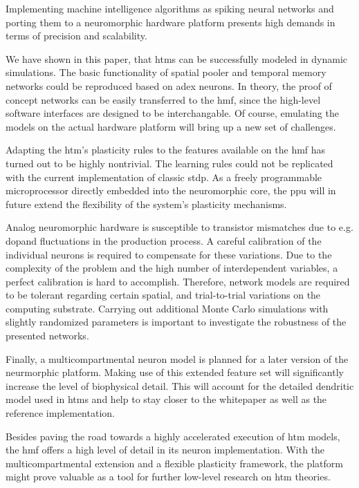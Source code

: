 Implementing machine intelligence algorithms as spiking neural networks and porting them to a neuromorphic hardware platform presents high demands in terms of precision and scalability.

We have shown in this paper, that \glspl{htm} can be successfully modeled in dynamic simulations. The basic functionality of spatial pooler and temporal memory networks could be reproduced based on \gls{adex} neurons. In theory, the proof of concept networks can be easily transferred to the \gls{hmf}, since the high-level software interfaces are designed to be interchangable. Of course, emulating the models on the actual hardware platform will bring up a new set of challenges.

Adapting the \gls{htm}'s plasticity rules to the features available on the \gls{hmf} has turned out to be highly nontrivial. The learning rules could not be replicated with the current implementation of classic \gls{stdp}. As a freely programmable microprocessor directly embedded into the neuromorphic core, the \gls{ppu} will in future extend the flexibility of the system's plasticity mechanisms.

Analog neuromorphic hardware is susceptible to transistor mismatches due to e.g. dopand fluctuations in the production process. A careful calibration of the individual neurons is required to compensate for these variations. Due to the complexity of the problem and the high number of interdependent variables, a perfect calibration is hard to accomplish. Therefore, network models are required to be tolerant regarding certain spatial, and trial-to-trial variations on the computing substrate. Carrying out additional Monte Carlo simulations with slightly randomized parameters is important to investigate the robustness of the presented networks.

Finally, a multicompartmental neuron model is planned for a later version of the neurmorphic platform. Making use of this extended feature set will significantly increase the level of biophysical detail. This will account for the detailed dendritic model used in \glspl{htm} and help to stay closer to the whitepaper as well as the reference implementation.

Besides paving the road towards a highly accelerated execution of \gls{htm} models, the \gls{hmf} offers a high level of detail in its neuron implementation. With the multicompartmental extension and a flexible plasticity framework, the platform might prove valuable as a tool for further low-level research on \gls{htm} theories.
